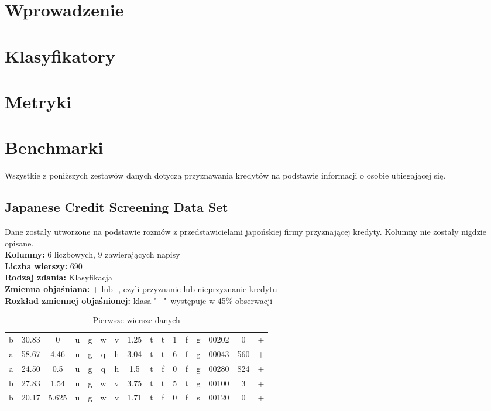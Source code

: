 \documentclass[pl]{minipw} %
\begin{document}
\sloppy


\tableofcontents


\cleardoublepage
\pagestyle{fancy}

\chapter*{Wprowadzenie}

\chapter{Klasyfikatory}

\chapter{Metryki}

\chapter{Benchmarki}
Wszystkie z poniższych zestawów danych dotyczą przyznawania kredytów na podstawie informacji o osobie ubiegającej się.
\section{Japanese Credit Screening Data Set}
Dane zostały utworzone na podstawie rozmów z przedstawicielami japońskiej firmy przyznającej kredyty. Kolumny nie zostały nigdzie opisane. \\
\textbf{Kolumny:} 6 liczbowych, 9 zawierających napisy \\
\textbf{Liczba wierszy:} 690 \\
\textbf{Rodzaj zdania:} Klasyfikacja \\
\textbf{Zmienna objaśniana:} + lub -, czyli przyznanie lub nieprzyznanie kredytu \\
\textbf{Rozkład zmiennej objaśnionej:} klasa "+"\ występuje w 45\% obserwacji \\
\begin{table}[H]
\caption{Pierwsze wiersze danych}
\label{use_case_tab}
\centering
\begin{tabular}{|c|c|c|c|c|c|c|c|c|c|c|c|c|c|c|c|}
\hline

b  & 30.83  & 0  & u  & g  & w  & v  & 1.25  & t  & t  & 1  & f  & g  & 00202  & 0  & +\\
a  & 58.67  & 4.46  & u  & g  & q  & h  & 3.04  & t  & t  & 6  & f  & g  & 00043  & 560  & +\\
a  & 24.50  & 0.5  & u  & g  & q  & h  & 1.5  & t  & f  & 0  & f  & g  & 00280  & 824  & +\\
b  & 27.83  & 1.54  & u  & g  & w  & v  & 3.75  & t  & t  & 5  & t  & g  & 00100  & 3  & +\\
b  & 20.17  & 5.625  & u  & g  & w  & v  & 1.71  & t  & f  & 0  & f  & s  & 00120  & 0  & +\\
\hline
\end{tabular}
\end{table}
\end{document}
